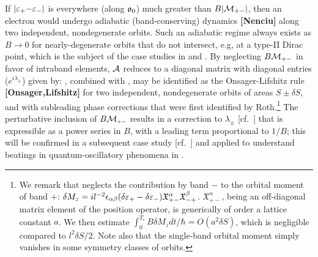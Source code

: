 \documentclass[aps, prb, showpacs, twocolumn, notitlepage, superscriptaddress]{revtex4-1}
\begin{document}
 If $|\varepsilon_+{-}\varepsilon_-|$ is everywhere (along $\mathfrak{o}_0$) much greater than $B|{\cal M}_{+-}|$, then an electron would undergo adiabatic (band-conserving) dynamics \textbf{[Nenciu]} along two independent, nondegenerate orbits. Such an adiabatic regime always exists as $B{\rightarrow} 0$ for nearly-degenerate orbits that do not intersect, e.g, at a type-II Dirac point, which is the subject of the case studies in  and .
By  neglecting  $B{\cal M}_{+-}$ in favor of intraband elements,  ${\cal A}$ reduces to a diagonal matrix with  diagonal entries ($e^{i\lambda_{\pm}}$) given by:
, combined with , may be identified as the Onsager-Lifshitz rule \textbf{[Onsager,Lifshitz]} for two independent, nondegenerate orbits of areas $S{\pm}\delta S$, and with subleading phase corrections that were first identified by Roth\cite{rothmag}.\footnote{We remark that  neglects the contribution by band $-$ to the orbital moment of band $+$: $\delta M_z=il^{-2}\epsilon_{\alpha\beta}(\delta \varepsilon_+-\delta \varepsilon_-)\mathfrak{X}^{\alpha}_{+-}\mathfrak{X}^{\beta}_{-+}$. $\mathfrak{X}^{\alpha}_{+-}$, being an off-diagonal matrix element of the position operator, is generically of order a lattice constant $a$. We then estimate $\int_0^{T_c} B\delta M_z dt/\hbar=O(a^2 \delta S)$, which is negligible compared to $l^2\delta S/2$. Note also that the single-band orbital moment simply vanishes in some symmetry classes of orbits\cite{100p}.} The perturbative inclusion of $B{\cal M}_{\scriptscriptstyle{+-}}$ results in a correction to $\lambda_{\pm}$ [cf.\ ] that is expressible as a power series in $B$, with a leading term proportional to $1/B$; this will be confirmed in a subsequent case study [cf.\ ] and applied to understand beatings in quantum-oscillatory phenomena in .



\end{document}

